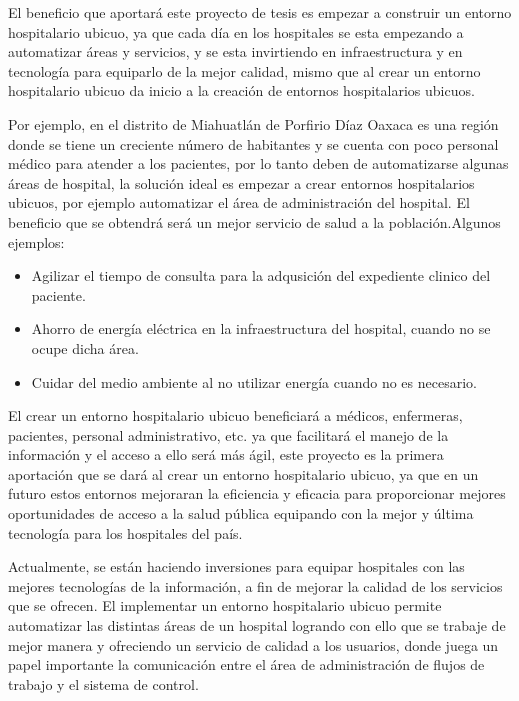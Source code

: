 El beneficio que aportará este proyecto de tesis es empezar a
construir un entorno hospitalario ubicuo, ya que cada día en los
hospitales se esta empezando a automatizar áreas y servicios, y se
esta invirtiendo en infraestructura y en tecnología para equiparlo
de la mejor calidad, mismo que al crear un entorno hospitalario
ubicuo da inicio a la creación de entornos hospitalarios
ubicuos.\\

\vspace{0.2cm}

Por ejemplo, en el distrito de Miahuatlán de Porfirio Díaz Oaxaca
es una región donde se tiene un creciente número de habitantes y
se cuenta con poco personal médico para atender a los pacientes,
por lo tanto deben de automatizarse algunas áreas de hospital, la
solución ideal es empezar a crear entornos hospitalarios ubicuos,
por ejemplo automatizar el área de administración del hospital. El
beneficio que se obtendrá será un mejor servicio de salud a la
población.Algunos ejemplos:\\

\begin{itemize}
    \item Agilizar el tiempo de consulta para la adqusición del
    expediente clinico del paciente.
    \item Ahorro de energía eléctrica en la infraestructura del
    hospital, cuando no se ocupe dicha área.
    \item Cuidar del medio ambiente al no utilizar energía cuando
    no es necesario.
\end{itemize}

\vspace{0.2cm}

El crear un entorno hospitalario ubicuo beneficiará a médicos,
enfermeras, pacientes, personal administrativo, etc. ya que
facilitará el manejo de la información y el acceso a ello será más
ágil, este proyecto es la primera aportación que se dará al crear
un entorno hospitalario ubicuo, ya que en un futuro estos entornos
mejoraran la eficiencia y eficacia para proporcionar mejores
oportunidades de acceso a la salud pública equipando con la mejor
y última tecnología para los hospitales del país.\\

\vspace{0.2cm}

Actualmente, se están haciendo inversiones para equipar hospitales
con las mejores tecnologías de la información, a fin de mejorar la
calidad de los servicios que se ofrecen. El implementar un entorno
hospitalario ubicuo permite automatizar las distintas áreas de un
hospital logrando con ello que se trabaje de mejor manera y
ofreciendo un servicio de calidad a los usuarios, donde juega un
papel importante la comunicación entre el área de
administración de flujos de trabajo y el sistema de control.\\

